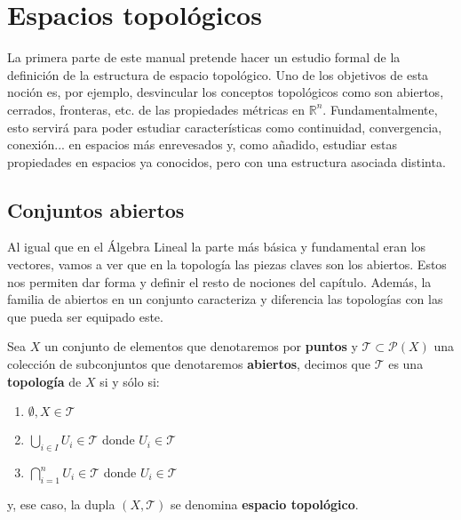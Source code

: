 \chapter{Espacios topológicos}
\label{cha:espacios_topologicos}
La primera parte de este manual pretende hacer un estudio formal de la definición de la estructura de espacio topológico. Uno de los objetivos de esta noción es, por ejemplo, desvincular los conceptos topológicos como son abiertos, cerrados, fronteras, etc. de las propiedades métricas en $\mathbb{R}^n$. Fundamentalmente, esto servirá para poder estudiar características como continuidad, convergencia, conexión... en espacios más enrevesados y, como añadido, estudiar estas propiedades en espacios ya conocidos, pero con una estructura asociada distinta.

\section{Conjuntos abiertos}
\label{sec:conjuntos_abiertos}
Al igual que en el Álgebra Lineal la parte más básica y fundamental eran los vectores, vamos a ver que en la topología las piezas claves son los abiertos. Estos nos permiten dar forma y definir el resto de nociones del capítulo. Además, la familia de abiertos en un conjunto caracteriza y diferencia las topologías con las que pueda ser equipado este.

\begin{defi}
Sea $X$ un conjunto de elementos que denotaremos por \textbf{puntos} y $\mathcal{T} \subset \mathcal{P}\left( X \right)$ una colección de subconjuntos que denotaremos \textbf{abiertos}, decimos que $\mathcal{T}$ es una \textbf{topología} de $X$ si y sólo si:
\begin{enumerate}
    \item $\emptyset, X \in \mathcal{T}$ 
    \item $\bigcup_{i \in I} U_i \in \mathcal{T}$ donde $U_i \in \mathcal{T}$
    \item $\bigcap_{i=1}^n U_i \in \mathcal{T}$ donde $U_i \in \mathcal{T}$
\end{enumerate}
y, ese caso, la dupla $\left( X, \mathcal{T} \right)$ se denomina \textbf{espacio topológico}.
\end{defi}

